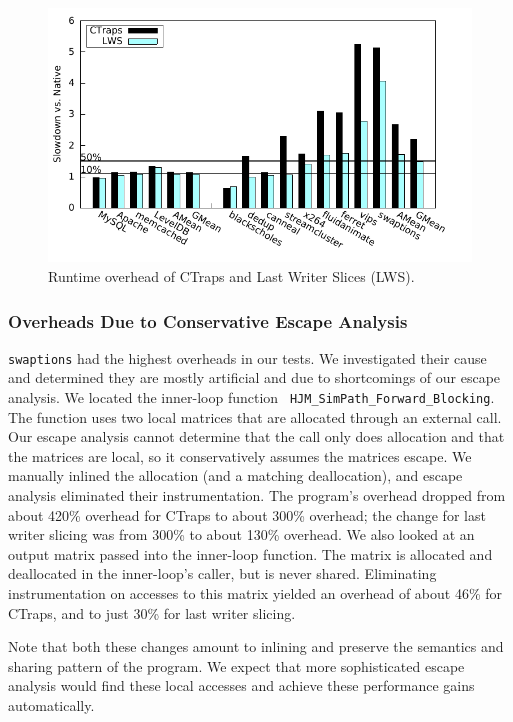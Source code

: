 \documentclass[preprint,9pt]{sigplanconf}
\newcommand{\ctraps}{CTraps\xspace}
\begin{document}
\begin{figure}
\centering
\includegraphics[width=.9\columnwidth]{plots/perf.pdf}
\caption{\label{fig:perfall}Runtime overhead of \ctraps and Last Writer Slices (LWS).}
\end{figure}

\subsubsection{Overheads Due to Conservative Escape Analysis}
\label{sec:eval:conservative}
{\tt swaptions} had the highest overheads in our tests.  We investigated their
cause and determined they are mostly artificial and due to shortcomings of our
escape analysis.  We located the inner-loop function {\tt
HJM\_SimPath\_Forward\_Blocking}.  The function uses two local matrices that
are allocated through an external call.  Our escape analysis cannot determine
that the call only does allocation and that the matrices are local, so it
conservatively assumes the matrices escape.  We manually inlined the allocation
(and a matching deallocation), and escape analysis eliminated their
instrumentation.  The program's overhead dropped from about 420\% overhead for
\ctraps to about 300\% overhead; the change for last writer slicing was from 300\% to about
130\% overhead.  We also looked at an output matrix passed into the inner-loop
function.  The matrix is allocated and deallocated in the inner-loop's caller,
but is never shared.  Eliminating instrumentation on accesses to this matrix
yielded an overhead of about 46\% for \ctraps, and to just 30\% for
last writer slicing.

Note that both these changes amount to inlining and preserve the semantics and
sharing pattern of the program.  We expect that more sophisticated escape
analysis would find these local accesses and achieve these performance gains
automatically.
\end{document}
